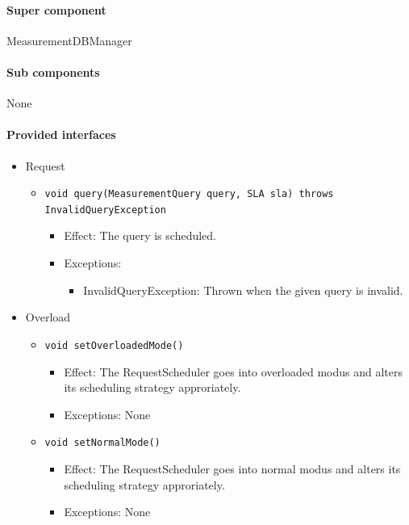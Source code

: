 \documentclass[a4paper,10pt]{article}
\begin{document}
\paragraph{Super component} MeasurementDBManager

\paragraph{Sub components} None

\paragraph{Provided interfaces}
\begin{itemize}
    \item Request
    \begin{itemize}
        \item \texttt{void query(MeasurementQuery query, SLA sla) throws InvalidQueryException}
        \begin{itemize}
            \item Effect: The query is scheduled.
            \item Exceptions:
            \begin{itemize}
                \item InvalidQueryException: Thrown when the given query is invalid.
            \end{itemize}
		\end{itemize}
    \end{itemize}

    \item Overload
    \begin{itemize}
        \item \texttt{void setOverloadedMode()}
        \begin{itemize}
            \item Effect: The RequestScheduler goes into overloaded modus and alters its scheduling strategy approriately.
            \item Exceptions: None
        \end{itemize}
        \item \texttt{void setNormalMode()}
        \begin{itemize}
            \item Effect: The RequestScheduler goes into normal modus and alters its scheduling strategy approriately.
            \item Exceptions: None
        \end{itemize}
    \end{itemize}
\end{itemize}
\end{document}
